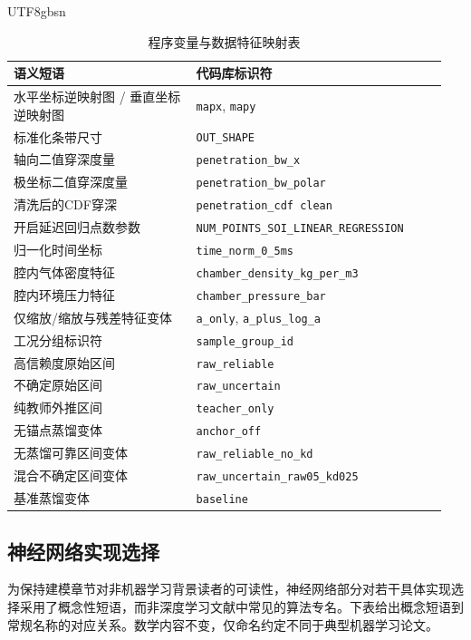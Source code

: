\documentclass[english, 12pt, a4paper, elec, utf8, a-2b, online]{aaltothesis}
\begin{document}
\begin{CJK*}{UTF8}{gbsn}
\begin{table}[h]
\centering
\begin{tabular}{p{0.4\linewidth} p{0.55\linewidth}}
\toprule
\textbf{语义短语} & \textbf{代码库标识符} \\
\midrule
水平坐标逆映射图 / 垂直坐标逆映射图 & \texttt{mapx}, \texttt{mapy} \\
标准化条带尺寸 & \texttt{OUT\_SHAPE} \\
轴向二值穿深度量 & \texttt{penetration\_bw\_x} \\
极坐标二值穿深度量 & \texttt{penetration\_bw\_polar} \\
清洗后的CDF穿深 & \texttt{penetration\_cdf clean} \\
开启延迟回归点数参数 & \texttt{NUM\_POINTS\_SOI\_LINEAR\_REGRESSION} \\
归一化时间坐标 & \texttt{time\_norm\_0\_5ms} \\
腔内气体密度特征 & \texttt{chamber\_density\_kg\_per\_m3} \\
腔内环境压力特征 & \texttt{chamber\_pressure\_bar} \\
仅缩放/缩放与残差特征变体 & \texttt{a\_only}, \texttt{a\_plus\_log\_a} \\
工况分组标识符 & \texttt{sample\_group\_id} \\
高信赖度原始区间 & \texttt{raw\_reliable} \\
不确定原始区间 & \texttt{raw\_uncertain} \\
纯教师外推区间 & \texttt{teacher\_only} \\
无锚点蒸馏变体 & \texttt{anchor\_off} \\
无蒸馏可靠区间变体 & \texttt{raw\_reliable\_no\_kd} \\
混合不确定区间变体 & \texttt{raw\_uncertain\_raw05\_kd025} \\
基准蒸馏变体 & \texttt{baseline} \\
\bottomrule
\end{tabular}
\caption{程序变量与数据特征映射表}
\end{table}

\subsection{神经网络实现选择}
\label{app:nn-implementation-mapping}

为保持建模章节对非机器学习背景读者的可读性，神经网络部分对若干具体实现选择采用了概念性短语，而非深度学习文献中常见的算法专名。下表给出概念短语到常规名称的对应关系。数学内容不变，仅命名约定不同于典型机器学习论文。


\end{CJK*}
\end{document}
